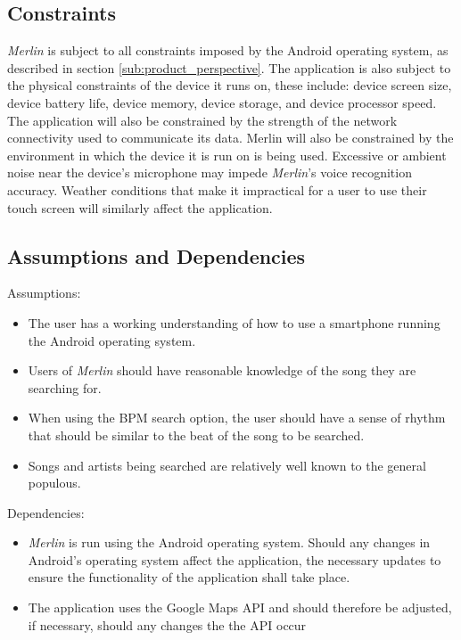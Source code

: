\documentclass[]{article}
\newcommand{\merlin}{\textit{Merlin }}
\newcommand{\merlins}{\textit{Merlin}'s }
\begin{document}
\subsection{Constraints}
\label{sub:constraints}
	\merlin is subject to all constraints imposed by the Android operating system, as described in section \ref{sub:product_perspective}. The application is also subject to the physical constraints of the device it runs on, these include: device screen size, device battery life, device memory, device storage, and device processor speed. The application will also be constrained by the strength of the network connectivity used to communicate its data. Merlin will also be constrained by the environment in which the device it is run on is being used. Excessive or ambient noise near the device's microphone may impede \merlins voice recognition accuracy. Weather conditions that make it impractical for a user to use their touch screen will similarly affect the application. 

\subsection{Assumptions and Dependencies}
\label{sub:assumptions_and_dependencies}
Assumptions:
\begin{itemize}
	\item The user has a working understanding of how to use a smartphone running the Android operating system.
	\item Users of \merlin should have reasonable knowledge of the song they are searching for.
	\item When using the BPM search option, the user should have a sense of rhythm that should be similar to the beat of the song to be searched.
	\item Songs and artists being searched are relatively well known to the general populous.
\end{itemize}

\noindent Dependencies:
\begin{itemize}
	\item \merlin is run using the Android operating system. Should any changes in Android's operating system affect the application, the necessary updates to ensure the functionality of the application shall take place.
	\item The application uses the Google Maps API and should therefore be adjusted, if necessary, should any changes the the API occur
\end{itemize}
\end{document}
